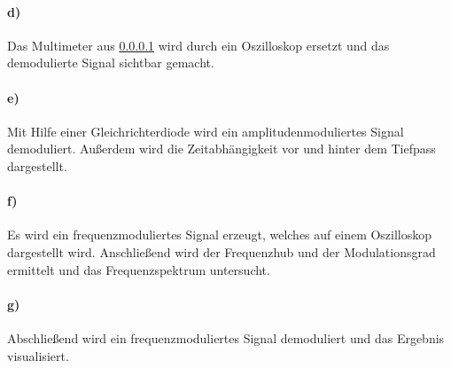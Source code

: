 \paragraph{d)}
\label{par:d}
Das Multimeter aus \ref{par:d} wird durch ein Oszilloskop ersetzt und das demodulierte Signal sichtbar gemacht.

\paragraph{e)}
\label{par:e}
Mit Hilfe einer Gleichrichterdiode wird ein amplitudenmoduliertes Signal demoduliert.
Außerdem wird die Zeitabhängigkeit vor und hinter dem Tiefpass dargestellt.

\paragraph{f)}
\label{par:f}
Es wird ein frequenzmoduliertes Signal erzeugt, welches auf einem Oszilloskop dargestellt wird. Anschließend wird der Frequenzhub und
der Modulationsgrad ermittelt und das Frequenzspektrum untersucht.

\paragraph{g)}
\label{par:g}
Abschließend wird ein frequenzmoduliertes Signal demoduliert und das Ergebnis visualisiert.
